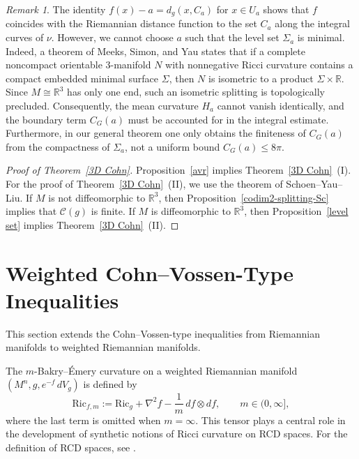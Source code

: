 \documentclass[12pt,oneside,a4paper]{article}
\theoremstyle{mytheorem}
\theoremstyle{remark}
\newtheorem{remark}[definition]{Remark}
\begin{document}
\begin{remark}
The identity $f(x) - a = d_g(x, C_a)$ for $x \in U_a$ shows that $f$ coincides with the Riemannian distance function to the set $C_a$ along the integral curves of $\nu$. However, we cannot choose $a$ such that the level set $\Sigma_a$ is minimal. Indeed, a theorem of Meeks, Simon, and Yau \cite[Theorem~6]{zbMATH03824612} states that if a complete noncompact orientable $3$-manifold $N$ with nonnegative Ricci curvature contains a compact embedded minimal surface $\Sigma$, then $N$ is isometric to a product $\Sigma \times \mathbb{R}$. Since $M \cong \mathbb{R}^3$  has only one end, such an isometric splitting is topologically precluded. Consequently, the mean curvature $H_a$ cannot vanish identically, and the boundary term $C_G(a)$ must be accounted for in the integral estimate. Furthermore, in our general theorem one only obtains the finiteness of $C_G(a)$ from the compactness of $\Sigma_a$, not a uniform bound $C_G(a) \le 8\pi$.
\end{remark}

\begin{proof}[Proof of Theorem~\ref{3D Cohn}]
Proposition~\ref{avr} implies Theorem~\ref{3D Cohn}~(I). For the proof of Theorem~\ref{3D Cohn}~(II), we use the theorem of Schoen--Yau--Liu. If \(M\) is not diffeomorphic to \(\mathbb{R}^3\), then Proposition~\ref{codim2-splitting-Sc} implies that \(\mathcal{C}(g)\) is finite. If \(M\) is diffeomorphic to \(\mathbb{R}^3\), then Proposition~\ref{level set} implies Theorem~\ref{3D Cohn}~(II).
\end{proof}



\section{Weighted Cohn--Vossen-Type Inequalities}\label{weighted}
This section extends the Cohn--Vossen-type inequalities
from Riemannian manifolds to weighted Riemannian manifolds.


The $m$-Bakry--Émery  curvature on a weighted Riemannian manifold $  (M^n,g,e^{-f}\,dV_g)  $ is defined by
$$\mathrm{Ric}_{f,m} := \mathrm{Ric}_g + \nabla^2 f - \frac{1}{m}\,df \otimes df, \qquad m \in (0,\infty],$$
where the last term is omitted when $m=\infty $. This tensor plays a central role in the development of synthetic notions of Ricci curvature on 
RCD spaces. For the definition of RCD spaces, see \cite{zbMATH07740333}.
\end{document}

